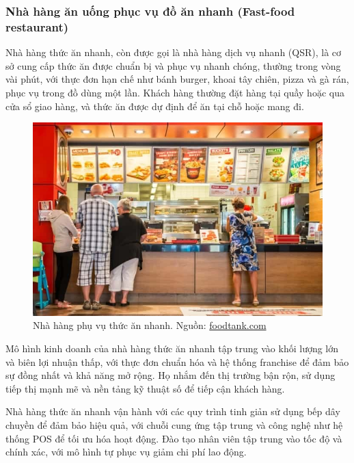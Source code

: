 \subsubsection{Nhà hàng ăn uống phục vụ đồ ăn nhanh (Fast-food restaurant)}
Nhà hàng thức ăn nhanh, còn được gọi là nhà hàng dịch vụ nhanh (QSR), là cơ sở cung cấp thức ăn được chuẩn bị và phục vụ nhanh chóng, thường trong vòng vài phút, với thực đơn hạn chế như bánh burger, khoai tây chiên, pizza và gà rán, phục vụ trong đồ dùng một lần. Khách hàng thường đặt hàng tại quầy hoặc qua cửa sổ giao hàng, và thức ăn được dự định để ăn tại chỗ hoặc mang đi. \\


\begin{figure}[H]
	\centering
	\includegraphics[width=15cm]{Images/fastfood.jpg}
	\vspace{0.5cm}
	\caption{Nhà hàng phụ vụ thức ăn nhanh. Nguồn: \href{https://foodtank.com/news/2015/08/world-health-organization-study-proves-need-for-regulation-of-fast-food/}{foodtank.com}}
\end{figure}

Mô hình kinh doanh của nhà hàng thức ăn nhanh tập trung vào khối lượng lớn và biên lợi nhuận thấp, với thực đơn chuẩn hóa và hệ thống franchise để đảm bảo sự đồng nhất và khả năng mở rộng. Họ nhắm đến thị trường bận rộn, sử dụng tiếp thị mạnh mẽ và nền tảng kỹ thuật số để tiếp cận khách hàng.

Nhà hàng thức ăn nhanh vận hành với các quy trình tinh giản sử dụng bếp dây chuyền để đảm bảo hiệu quả, với chuỗi cung ứng tập trung và công nghệ như hệ thống POS để tối ưu hóa hoạt động. Đào tạo nhân viên tập trung vào tốc độ và chính xác, với mô hình tự phục vụ giảm chi phí lao động.

